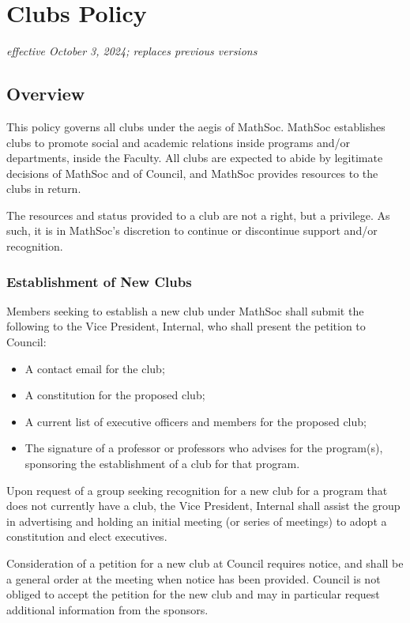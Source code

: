 \section{Clubs Policy}
\emph{effective October 3, 2024; replaces previous versions}
\subsection{Overview}
This policy governs all clubs under the aegis of MathSoc. MathSoc establishes
clubs to promote social and academic relations inside programs and/or
departments, inside the Faculty. All clubs are expected to abide by legitimate
decisions of MathSoc and of Council, and MathSoc provides resources to the clubs
in return.

The resources and status provided to a club are not a right, but a privilege.
As such, it is in MathSoc's discretion to continue or discontinue support and/or
recognition.

\subsubsection{Establishment of New Clubs}
Members seeking to establish a new club under MathSoc shall submit the following
to the Vice President, Internal, who shall present the petition to Council:

\begin{itemize}
  \item A contact email for the club;
  \item A constitution for the proposed club;
  \item A current list of executive officers and members for the proposed club;
  \item The signature of a professor or professors who advises for the
	  program(s), sponsoring the establishment of a club for that program.
\end{itemize}

Upon request of a group seeking recognition for a new club for a program that
does not currently have a club, the Vice President, Internal shall assist the
group in advertising and holding an initial meeting (or series of meetings) to
adopt a constitution and elect executives.

Consideration of a petition for a new club at Council requires notice, and shall
be a general order at the meeting when notice has been provided. Council is not
obliged to accept the petition for the new club and may in particular request
additional information from the sponsors.

